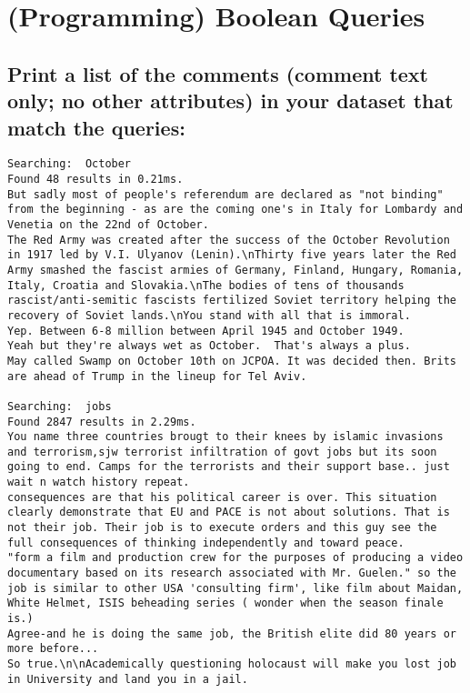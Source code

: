 \documentclass{scrartcl}
\begin{document}
\section{(Programming) Boolean Queries
}

\subsection{Print a list of the comments (comment text only; no other attributes) in your dataset that
match the queries: }

\begin{lstlisting}
Searching:  October
Found 48 results in 0.21ms.
But sadly most of people's referendum are declared as "not binding" from the beginning - as are the coming one's in Italy for Lombardy and Venetia on the 22nd of October.
The Red Army was created after the success of the October Revolution  in 1917 led by V.I. Ulyanov (Lenin).\nThirty five years later the Red Army smashed the fascist armies of Germany, Finland, Hungary, Romania, Italy, Croatia and Slovakia.\nThe bodies of tens of thousands rascist/anti-semitic fascists fertilized Soviet territory helping the recovery of Soviet lands.\nYou stand with all that is immoral.
Yep. Between 6-8 million between April 1945 and October 1949.
Yeah but they're always wet as October.  That's always a plus.
May called Swamp on October 10th on JCPOA. It was decided then. Brits are ahead of Trump in the lineup for Tel Aviv.

Searching:  jobs
Found 2847 results in 2.29ms.
You name three countries brougt to their knees by islamic invasions and terrorism,sjw terrorist infiltration of govt jobs but its soon going to end. Camps for the terrorists and their support base.. just wait n watch history repeat.
consequences are that his political career is over. This situation clearly demonstrate that EU and PACE is not about solutions. That is not their job. Their job is to execute orders and this guy see the full consequences of thinking independently and toward peace.
"form a film and production crew for the purposes of producing a video documentary based on its research associated with Mr. Guelen." so the job is similar to other USA 'consulting firm', like film about Maidan, White Helmet, ISIS beheading series ( wonder when the season finale is.)
Agree-and he is doing the same job, the British elite did 80 years or more before...
So true.\n\nAcademically questioning holocaust will make you lost job in University and land you in a jail.


\end{lstlisting}
\end{document}
